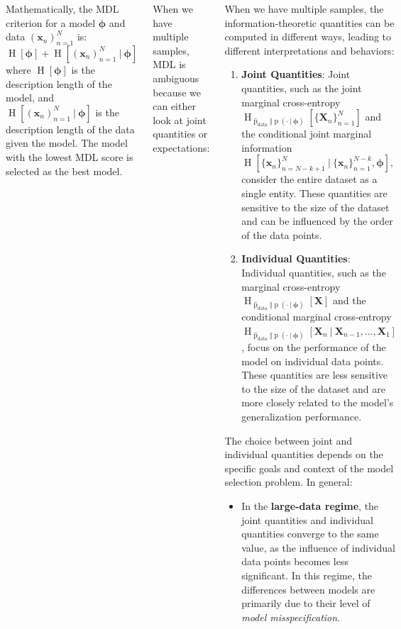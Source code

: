 \documentclass[25pt,a0paper,landscape]{tikzposter}
\newcommand{\MidSymbol}[1][]{\:#1\:}
\newcommand{\given}{\MidSymbol[\vert]}
\DeclareMathOperator{\opInformationContent}{H}
\newcommand{\ICof}[1]{\opInformationContent[#1]}
\DeclareMathOperator{\opEntropy}{H}
\newcommand{\Hof}[1]{\opEntropy[#1]}
\newcommand{\iCrossEntropy}[3]{\opEntropy_{#1 \Vert #2}[#3]}
\DeclareMathOperator{\opp}{p}
\newcommand{\pof}[1]{\opp(#1)}
\newcommand{\h}{\boldsymbol{\phi}}
\newcommand{\xNset}{(\x_n)_{n=1}^N}
\newcommand{\XNset}{\{\X_n\}_{n=1}^N}
\newcommand{\xNsetk}{\{\x_n\}_{n=N-k+1}^N}
\newcommand{\xNkset}{\{\x_n\}_{n=1}^{N-k}}
\newcommand{\x}{\boldsymbol{x}}
\newcommand{\X}{\boldsymbol{X}}
\newcommand{\oppdata}{\hat{\opp}_{\text{data}}}
\begin{document}
\begin{columns}
{\begin{backgroundbox}[title=Minimum Description Length (MDL)]
      Mathematically, the MDL criterion for a model $\h$ and data $\xNset$ is:
      \begin{equation}
        \ICof{\h} + \ICof{\xNset \given \h}
      \end{equation}
      where $\ICof{\h}$ is the description length of the model, and $\ICof{\xNset \given \h}$ is the description length of the data given the model. The model with the lowest MDL score is selected as the best model.
    \end{backgroundbox}
    \begin{theorybox}[title=Multiple vs Individual Points]
      When we have multiple samples, MDL is ambiguous because we can either look at joint quantities or expectations:
    \end{theorybox}
    \begin{theorybox}[title=Multiple vs Individual Points]
      When we have multiple samples, the information-theoretic quantities can be computed in different ways, leading to different interpretations and behaviors:
      \begin{enumerate}
      \item \textbf{Joint Quantities}: Joint quantities, such as the joint marginal cross-entropy $\iCrossEntropy{\oppdata}{\pof{\cdot \given \h}}{\XNset}$ and the conditional joint marginal information $\Hof{\xNsetk \given \xNkset, \h}$, consider the entire dataset as a single entity. These quantities are sensitive to the size of the dataset and can be influenced by the order of the data points.
      \item \textbf{Individual Quantities}: Individual quantities, such as the marginal cross-entropy $\iCrossEntropy{\oppdata}{\pof{\cdot \given \h}}{\X}$ and the conditional marginal cross-entropy $\iCrossEntropy{\oppdata}{\pof{\cdot \given \h}}{\X_n \given \X_{n-1}, \ldots, \X_1}$, focus on the performance of the model on individual data points. These quantities are less sensitive to the size of the dataset and are more closely related to the model's generalization performance.
      \end{enumerate}
      The choice between joint and individual quantities depends on the specific goals and context of the model selection problem. In general:
      \begin{itemize}
      \item In the \textbf{large-data regime}, the joint quantities and individual quantities converge to the same value, as the influence of individual data points becomes less significant. In this regime, the differences between models are primarily due to their level of \emph{model misspecification}.

\end{itemize}
\end{theorybox}}
\end{columns}
\end{document}
